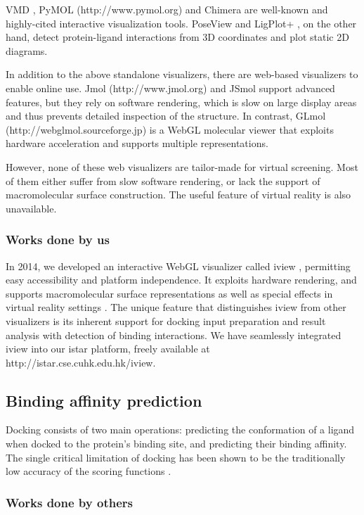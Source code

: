 \documentclass[a4paper,12pt]{article}
\begin{document}
VMD \citep{1220}, PyMOL (http://www.pymol.org) and Chimera \citep{1219} are well-known and highly-cited interactive visualization tools. PoseView \citep{748} and LigPlot+ \citep{951}, on the other hand, detect protein-ligand interactions from 3D coordinates and plot static 2D diagrams.

In addition to the above standalone visualizers, there are web-based visualizers to enable online use. Jmol (http://www.jmol.org) and JSmol \citep{1314} support advanced features, but they rely on software rendering, which is slow on large display areas and thus prevents detailed inspection of the structure. In contrast, GLmol (http://webglmol.sourceforge.jp) is a WebGL molecular viewer that exploits hardware acceleration and supports multiple representations.

However, none of these web visualizers are tailor-made for virtual screening. Most of them either suffer from slow software rendering, or lack the support of macromolecular surface construction. The useful feature of virtual reality is also unavailable.

\subsubsection*{Works done by us}

In 2014, we developed an interactive WebGL visualizer called iview \cite{1366,1265}, permitting easy accessibility and platform independence. It exploits hardware rendering, and supports macromolecular surface representations as well as special effects in virtual reality settings \cite{1265}. The unique feature that distinguishes iview from other visualizers is its inherent support for docking input preparation and result analysis with detection of binding interactions. We have seamlessly integrated iview into our istar platform, freely available at http://istar.cse.cuhk.edu.hk/iview.

\subsection*{Binding affinity prediction}

Docking consists of two main operations: predicting the conformation of a ligand when docked to the protein's binding site, and predicting their binding affinity. The single critical limitation of docking has been shown to be the traditionally low accuracy of the scoring functions \cite{1362}.

\subsubsection*{Works done by others}
\end{document}
